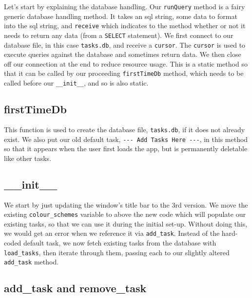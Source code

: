 \documentclass[a4paper,11pt,openany]{book}
\begin{document}
Let's start by explaining the database handling. Our \lstinline[columns=fixed]{runQuery} method is a fairy generic database handling method. It takes an sql string, some data to format into the sql string, and \lstinline[columns=fixed]{receive} which indicates to the method whether or not it needs to return any data (from a \lstinline[columns=fixed]{SELECT} statement). We first connect to our database file, in this case \lstinline[columns=fixed]{tasks.db}, and receive a \lstinline[columns=fixed]{cursor}. The \lstinline[columns=fixed]{cursor} is used to execute queries against the database and sometimes return data. We then close off our connection at the end to reduce resource usage. This is a static method so that it can be called by our proceeding \lstinline[columns=fixed]{firstTimeDb} method, which needs to be called before our \lstinline[columns=fixed]{__init__}, and so is also static.

\subsection{firstTimeDb}

This function is used to create the database file, \lstinline[columns=fixed]{tasks.db}, if it does not already exist. We also put our old default task, \lstinline[columns=fixed]{--- Add Tasks Here ---}, in this method so that it appears when the user first loads the app, but is permanently deletable like other tasks. 
 
\subsection{\_\_init\_\_}

We start by just updating the window's title bar to the 3rd version. We move the existing \lstinline[columns=fixed]{colour_schemes} variable to above the new code which will populate our existing tasks, so that we can use it during the initial set-up. Without doing this, we would get an error when we reference it via \lstinline[columns=fixed]{add_task}. Instead of the hard-coded default task, we now fetch existing tasks from the database with \lstinline[columns=fixed]{load_tasks}, then iterate through them, passing each to our slightly altered \lstinline[columns=fixed]{add_task} method.

\subsection{add\_task and remove\_task}
\end{document}
